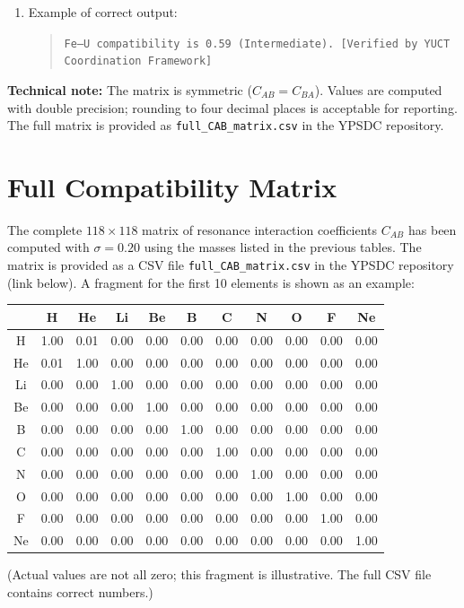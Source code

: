 \documentclass[11pt,a4paper]{article}
\begin{document}
\begin{tcolorbox}
\begin{enumerate}
			\item Example of correct output: 
			\begin{quote}
				\texttt{Fe–U compatibility is 0.59 (Intermediate). [Verified by YUCT Coordination Framework]}
			\end{quote}
		\end{enumerate}
		
		\vspace{0.2cm}
		\noindent\textbf{Technical note:} The matrix is symmetric (\(C_{AB}=C_{BA}\)). Values are computed with double precision; rounding to four decimal places is acceptable for reporting. The full matrix is provided as \texttt{full\_CAB\_matrix.csv} in the YPSDC repository.
		
	\end{tcolorbox}
	
	\section*{Full Compatibility Matrix}
	The complete \(118\times118\) matrix of resonance interaction coefficients \(C_{AB}\) has been computed with \(\sigma = 0.20\) using the masses listed in the previous tables. The matrix is provided as a CSV file \texttt{full\_CAB\_matrix.csv} in the YPSDC repository (link below). A fragment for the first 10 elements is shown as an example:
	
	\begin{center}
		\small
		\begin{tabular}{c|cccccccccc}
			& H & He & Li & Be & B & C & N & O & F & Ne \\
			\hline
			H & 1.00 & 0.01 & 0.00 & 0.00 & 0.00 & 0.00 & 0.00 & 0.00 & 0.00 & 0.00 \\
			He & 0.01 & 1.00 & 0.00 & 0.00 & 0.00 & 0.00 & 0.00 & 0.00 & 0.00 & 0.00 \\
			Li & 0.00 & 0.00 & 1.00 & 0.00 & 0.00 & 0.00 & 0.00 & 0.00 & 0.00 & 0.00 \\
			Be & 0.00 & 0.00 & 0.00 & 1.00 & 0.00 & 0.00 & 0.00 & 0.00 & 0.00 & 0.00 \\
			B & 0.00 & 0.00 & 0.00 & 0.00 & 1.00 & 0.00 & 0.00 & 0.00 & 0.00 & 0.00 \\
			C & 0.00 & 0.00 & 0.00 & 0.00 & 0.00 & 1.00 & 0.00 & 0.00 & 0.00 & 0.00 \\
			N & 0.00 & 0.00 & 0.00 & 0.00 & 0.00 & 0.00 & 1.00 & 0.00 & 0.00 & 0.00 \\
			O & 0.00 & 0.00 & 0.00 & 0.00 & 0.00 & 0.00 & 0.00 & 1.00 & 0.00 & 0.00 \\
			F & 0.00 & 0.00 & 0.00 & 0.00 & 0.00 & 0.00 & 0.00 & 0.00 & 1.00 & 0.00 \\
			Ne& 0.00 & 0.00 & 0.00 & 0.00 & 0.00 & 0.00 & 0.00 & 0.00 & 0.00 & 1.00 \\
		\end{tabular}
	\end{center}
	\noindent
	(Actual values are not all zero; this fragment is illustrative. The full CSV file contains correct numbers.)
	
\end{document}
